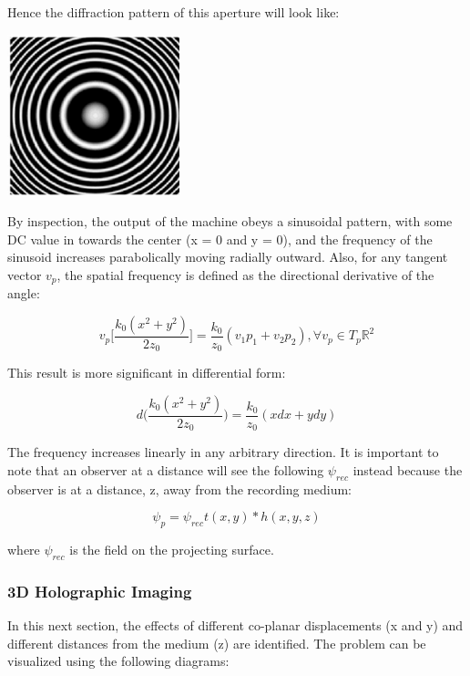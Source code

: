 \documentclass[12pt]{article}
\begin{document}
Hence the diffraction pattern of this aperture will look like:

\begin{center}
\includegraphics[width=50mm]{tupac8.png}
\end{center}

By inspection, the output of the machine obeys a sinusoidal pattern, with some DC value in towards the center (x = 0 and y = 0), and the frequency
of the sinusoid increases parabolically moving radially outward.
Also, for any tangent vector \(v_{p}\), the spatial frequency is defined as the directional derivative of the angle:

\begin{equation}
	v_{p}\bigg[ \frac{k_{0}(x^2 + y^2)}{2z_{0}} \bigg] = \frac{k_{0}}{z_{0}}(v_{1}p_{1} + v_{2}p_{2}), \forall v_{p} \in T_{p} \mathbb{R}^2
\end{equation}

This result is more significant in differential form:

\begin{equation}
	d \bigg( \frac{k_{0}(x^2 + y^2)}{2z_{0}} \bigg) = \frac{k_{0}}{z_{0}}(xdx + ydy)
\end{equation}

The frequency increases linearly in any arbitrary direction.
It is important to note that an observer at a distance will see the following
\(\psi_{rec}\) instead because the observer is at a distance, z, away from the
recording medium:

\begin{equation}
	\psi_{p} = \psi_{rec}t(x,y)*h(x,y,z)
\end{equation}

where \(\psi_{rec}\) is the field on the projecting surface.

\subsubsection{3D Holographic Imaging}

In this next section, the effects of different co-planar displacements (x and y) and different distances from the medium (z) are identified. The problem can be visualized using the following diagrams:
\end{document}
